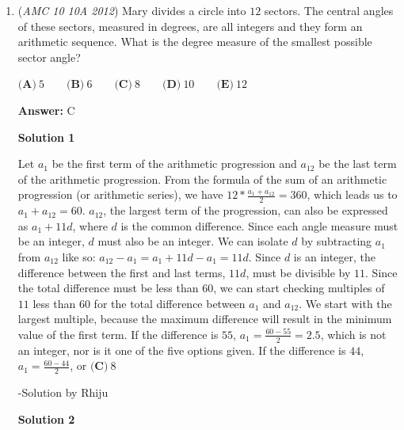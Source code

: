 \begin{enumerate}
 Thus, our probability is $\frac{12}{36} = \frac{1}{3}$. The answer is $\boxed{\textbf{(D)}\ \frac13}$.

 



\textbf{Solution 2}

Assume we roll the die with only evens first. For whatever value rolled, there are exactly 2 faces on the odd die that makes the sum 7. The odd die has 6 faces, so our probability is $\boxed{\textbf{(D)}\ \frac13}$.

 


	\item (\textit{AMC 10 10A 2012}) Mary divides a circle into $12$ sectors. The central angles of these sectors, measured in degrees, are all integers and they form an arithmetic sequence. What is the degree measure of the smallest possible sector angle?


 $\textbf{(A)}\ 5\qquad\textbf{(B)}\ 6\qquad\textbf{(C)}\ 8\qquad\textbf{(D)}\ 10\qquad\textbf{(E)}\ 12$

 \textbf{Answer: }C



\textbf{Solution 1}

Let $a_1$ be the first term of the arithmetic progression and $a_{12}$ be the last term of the arithmetic progression. From the formula of the sum of an arithmetic progression (or arithmetic series), we have $12*\frac{a_1+a_{12}}{2}=360$, which leads us to $a_1 + a_{12} = 60$. $a_{12}$, the largest term of the progression, can also be expressed as $a_1+11d$, where $d$ is the common difference. Since each angle measure must be an integer, $d$ must also be an integer. We can isolate $d$ by subtracting $a_1$ from $a_{12}$ like so: $a_{12}-a_1=a_1+11d-a_1=11d$. Since $d$ is an integer, the difference between the first and last terms, $11d$, must be divisible by $11.$ Since the total difference must be less than $60$, we can start checking multiples of $11$ less than $60$ for the total difference between $a_1$ and $a_{12}$. We start with the largest multiple, because the maximum difference will result in the minimum value of the first term. If  the difference is $55$, $a_1=\frac{60-55}{2}=2.5$, which is not an integer, nor is it one of the five options given. If the difference is $44$, $a_1=\frac{60-44}{2}$, or $\boxed{\textbf{(C)}\ 8}$

 -Solution by Rhiju

 



\textbf{Solution 2}


\end{enumerate}

